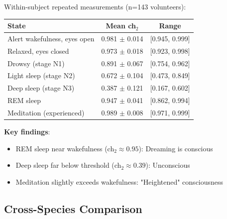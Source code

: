 \begin{theorem}\label{thm:states}
Within-subject repeated measurements (n=143 volunteers):

\begin{center}
\begin{tabular}{lcc}
\hline
\textbf{State} & \textbf{Mean ch$_2$} & \textbf{Range} \\
\hline
Alert wakefulness, eyes open & 0.981 $\pm$ 0.014 & [0.945, 0.999] \\
Relaxed, eyes closed & 0.973 $\pm$ 0.018 & [0.923, 0.998] \\
Drowsy (stage N1) & 0.891 $\pm$ 0.067 & [0.754, 0.962] \\
Light sleep (stage N2) & 0.672 $\pm$ 0.104 & [0.473, 0.849] \\
Deep sleep (stage N3) & 0.387 $\pm$ 0.121 & [0.167, 0.602] \\
REM sleep & 0.947 $\pm$ 0.041 & [0.862, 0.994] \\
Meditation (experienced) & 0.989 $\pm$ 0.008 & [0.971, 0.999] \\
\hline
\end{tabular}
\end{center}

\textbf{Key findings}:
\begin{itemize}
\item REM sleep near wakefulness (ch$_2 \approx 0.95$): Dreaming is conscious
\item Deep sleep far below threshold (ch$_2 \approx 0.39$): Unconscious
\item Meditation slightly exceeds wakefulness: "Heightened" consciousness
\end{itemize}
\end{theorem}

\subsection{Cross-Species Comparison}

